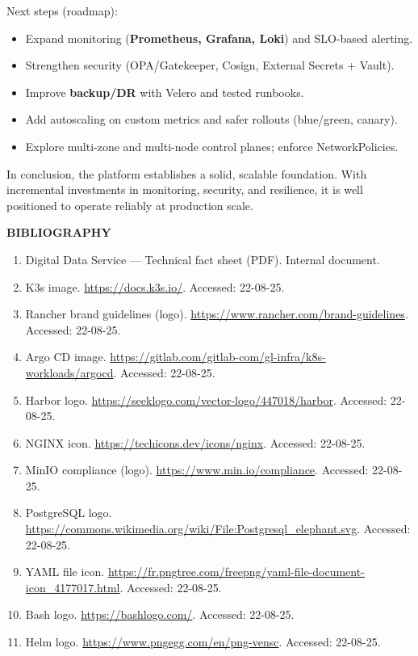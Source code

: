 \documentclass[a4paper,12pt]{report}
\begin{document}
\begin{doublespace}
Next steps (roadmap):
\begin{itemize}
    \item Expand monitoring (\textbf{Prometheus, Grafana, Loki}) and SLO-based alerting.
    \item Strengthen security (OPA/Gatekeeper, Cosign, External Secrets + Vault).
    \item Improve \textbf{backup/DR} with Velero and tested runbooks.
    \item Add autoscaling on custom metrics and safer rollouts (blue/green, canary).
    \item Explore multi-zone and multi-node control planes; enforce NetworkPolicies.
\end{itemize}

In conclusion, the platform establishes a solid, scalable foundation. With incremental investments in monitoring, security, and resilience, it is well positioned to operate reliably at production scale.
\end{doublespace}

\renewcommand{\headrulewidth}{1pt}
\fancyhead[L]{\hspace*{4cm}}

\newpage
\renewcommand{\headrulewidth}{1pt}
\fancyhead[L]{\hspace*{4cm}}
\begin{center}
\textbf{\huge{BIBLIOGRAPHY}}

\end{center}
\begin{doublespace}
\large{
\begin{enumerate}
    \item Digital Data Service — Technical fact sheet (PDF). Internal document.
    \item K3s image. \url{https://docs.k3s.io/}. Accessed: 22-08-25.
    \item Rancher brand guidelines (logo). \url{https://www.rancher.com/brand-guidelines}. Accessed: 22-08-25.
    \item Argo CD image. \url{https://gitlab.com/gitlab-com/gl-infra/k8s-workloads/argocd}. Accessed: 22-08-25.
    \item Harbor logo. \url{https://seeklogo.com/vector-logo/447018/harbor}. Accessed: 22-08-25.
    \item NGINX icon. \url{https://techicons.dev/icons/nginx}. Accessed: 22-08-25.
    \item MinIO compliance (logo). \url{https://www.min.io/compliance}. Accessed: 22-08-25.
    \item PostgreSQL logo. \url{https://commons.wikimedia.org/wiki/File:Postgresql_elephant.svg}. Accessed: 22-08-25.
    \item YAML file icon. \url{https://fr.pngtree.com/freepng/yaml-file-document-icon_4177017.html}. Accessed: 22-08-25.
    \item Bash logo. \url{https://bashlogo.com/}. Accessed: 22-08-25.
    \item Helm logo. \url{https://www.pngegg.com/en/png-vensc}. Accessed: 22-08-25.
\end{enumerate}
}
\end{doublespace}
\end{document}
